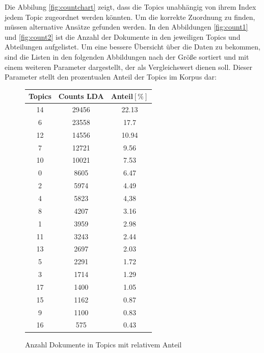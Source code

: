 \documentclass[german,version-2020-11]{uzl-thesis}
\begin{document}
Die Abbilung \ref{fig:countchart} zeigt, dass die Topics unabhängig von ihrem Index jedem Topic zugeordnet werden könnten. Um die korrekte Zuordnung zu finden, müssen alternative Ansätze gefunden werden. In den Abbildungen \ref{fig:count1} und \ref{fig:count2} ist die Anzahl der Dokumente in den jeweiligen Topics und Abteilungen aufgelistet. Um eine bessere Übersicht über die Daten zu bekommen, sind die Listen in den folgenden Abbildungen nach der Größe sortiert und mit einem weiteren Parameter dargestellt, der als Vergleichswert dienen soll. Dieser Parameter stellt den prozentualen Anteil der Topics im Korpus dar: 

\begin{figure}[H]
\begin{center}
\begin{tabular}{ccc}
\hline 
\hline
Topics & Counts LDA & Anteil$[\%]$\\
\hline
14&29456&22.13\\
6&23558&17.7\\
12&14556&10.94\\
7&12721&9.56\\
10&10021&7.53\\
0&8605&6.47\\
2&5974&4.49\\
4&5823&4,38\\
8&4207&3.16\\
1&3959&2.98\\
11&3243&2.44\\
13&2697&2.03\\
5&2291&1.72\\
3&1714&1.29\\
17&1400&1.05\\
15&1162&0.87\\
9&1100&0.83\\
16&575&0.43\\
\hline
\hline
\end{tabular}
\caption{Anzahl Dokumente in Topics mit relativem Anteil}
\label{fig:count3}
\end{center}
\end{figure}

\end{document}
